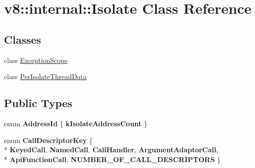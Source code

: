 \hypertarget{classv8_1_1internal_1_1_isolate}{}\section{v8\+:\+:internal\+:\+:Isolate Class Reference}
\label{classv8_1_1internal_1_1_isolate}
\subsection*{Classes}
\begin{DoxyCompactItemize}
\item 
class \hyperlink{classv8_1_1internal_1_1_isolate_1_1_exception_scope}{Exception\+Scope}
\item 
class \hyperlink{classv8_1_1internal_1_1_isolate_1_1_per_isolate_thread_data}{Per\+Isolate\+Thread\+Data}
\end{DoxyCompactItemize}
\subsection*{Public Types}
\begin{DoxyCompactItemize}
\item 
\hypertarget{classv8_1_1internal_1_1_isolate_a6ed9b2687bf08479f019e2cbb75503b2}{}enum {\bfseries Address\+Id} \{ {\bfseries k\+Isolate\+Address\+Count}
 \}\label{classv8_1_1internal_1_1_isolate_a6ed9b2687bf08479f019e2cbb75503b2}

\item 
\hypertarget{classv8_1_1internal_1_1_isolate_a697d151c6156b3dbc4bc765099f78fb0}{}enum {\bfseries Call\+Descriptor\+Key} \{ \\*
{\bfseries Keyed\+Call}, 
{\bfseries Named\+Call}, 
{\bfseries Call\+Handler}, 
{\bfseries Argument\+Adaptor\+Call}, 
\\*
{\bfseries Api\+Function\+Call}, 
{\bfseries N\+U\+M\+B\+E\+R\+\_\+\+O\+F\+\_\+\+C\+A\+L\+L\+\_\+\+D\+E\+S\+C\+R\+I\+P\+T\+O\+R\+S}
 \}\label{classv8_1_1internal_1_1_isolate_a697d151c6156b3dbc4bc765099f78fb0}

\end{DoxyCompactItemize}
